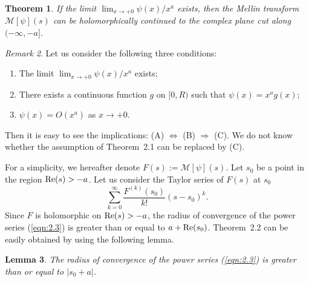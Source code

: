 \documentclass[12pt]{amsart}
\numberwithin{equation}{section}
\newtheorem{theorem}{Theorem}[section]
\newtheorem{lemma}[theorem]{Lemma}
\theoremstyle{definition}
\theoremstyle{remark}
\newtheorem{remark}[theorem]{Remark}
\newcommand{\1}{{\bf 1}}
\begin{document}
\begin{theorem}
If the limit $\lim_{x\to+0}\psi(x)/x^a$ exists,  
then the Mellin transform 
${\mathcal M}[\psi](s)$ can be holomorphically 
continued to 
the complex plane cut along 
$(-\infty,-a]$. 
\end{theorem}
\begin{remark}
Let us consider the following three conditions:
\begin{enumerate}
\item[(A)] 
The limit $\lim_{x\to+0}\psi(x)/x^a$ exists; 
\item[(B)] 
There exists a continuous function $g$ on $[0,R)$ such that 
$\psi(x)=x^a g(x)$; 
\item[(C)]
$\psi(x)=O(x^a)$ as $x\to+0$. 
\end{enumerate}
Then it is easy to see the implications: 
(A) $\Longleftrightarrow$
(B) $\Longrightarrow$
(C).
We do not know whether the assumption 
of Theorem~2.1 can be replaced by (C).
\end{remark}

For a simplicity, we hereafter denote 
$F(s):={\mathcal M}[\psi](s)$. 
Let $s_0$ be a point in
the region ${\rm Re}(s)>-a$. 
Let us consider the Taylor series of 
$F(s)$ at $s_0$
\begin{equation}\label{eqn:2.3}
\sum_{k=0}^{\infty}
\frac{F^{(k)}(s_0)}{k!}
(s-s_0)^k.
\end{equation}
Since $F$ is holomorphic on 
${\rm Re}(s)>-a$, 
the radius of convergence of 
the power series (\ref{eqn:2.3}) is greater than 
or equal to $a+{\rm Re}(s_0)$.
Theorem~2.2 can be easily obtained 
by using the following lemma. 

\begin{lemma}\label{lem:2.2}
The radius of convergence of 
the power series (\ref{eqn:2.3}) is greater than 
or equal to $|s_0+a|$.
\end{lemma}
\end{document}
